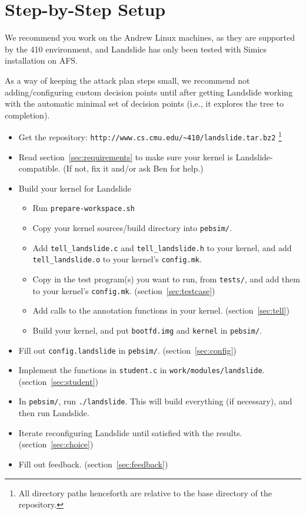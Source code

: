 \documentclass{article}
\begin{document}
\newpage
\appendix
\section{Step-by-Step Setup}
\label{sec:stepbystep}

We recommend you work on the Andrew Linux machines, as they are supported by the 410 environment, and Landslide has only been tested with Simics installation on AFS.

As a way of keeping the attack plan steps small, we recommend not adding/configuring custom decision points until after getting Landslide working with the automatic minimal set of decision points (i.e., it explores the tree to completion).

\begin{itemize}
	\item Get the repository: \texttt{http://www.cs.cmu.edu/{\textasciitilde}410/landslide.tar.bz2}
		\footnote{All directory paths henceforth are relative to the base directory of the repository.}
	\item Read section~\ref{sec:requirements} to make sure your kernel is Landslide-compatible. (If not, fix it and/or ask Ben for help.)
	\item Build your kernel for Landslide
	\begin{itemize}
		\item Run \texttt{prepare-workspace.sh}
		\item Copy your kernel sources/build directory into \texttt{pebsim/}.
		\item Add \texttt{tell\_landslide.c} and \texttt{tell\_landslide.h} to your kernel, and add \texttt{tell\_landslide.o} to your kernel's \texttt{config.mk}.
		\item Copy in the test program(s) you want to run, from \texttt{tests/}, and add them to your kernel's \texttt{config.mk}. (section~\ref{sec:testcase})
		\item Add calls to the annotation functions in your kernel. (section~\ref{sec:tell})
		\item Build your kernel, and put \texttt{bootfd.img} and \texttt{kernel} in \texttt{pebsim/}.
	\end{itemize}
	\item Fill out \texttt{config.landslide} in \texttt{pebsim/}. (section~\ref{sec:config})
	\item Implement the functions in \texttt{student.c} in \texttt{work/modules/landslide}. (section~\ref{sec:student})
	\item In \texttt{pebsim/}, run \texttt{./landslide}. This will build everything (if necessary), and then run Landslide.
	\item Iterate reconfiguring Landslide until satisfied with the results. (section~\ref{sec:choice})
	\item Fill out feedback. (section~\ref{sec:feedback})
\end{itemize}
\end{document}
